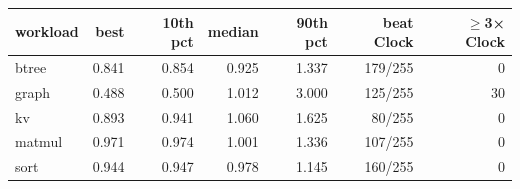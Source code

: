 \begin{tabular}{lrrrrrr}
\toprule
workload & best & 10th pct & median & 90th pct & beat Clock & $\geq$3× Clock \\
\midrule
btree & 0.841 & 0.854 & 0.925 & 1.337 & 179/255 & 0 \\
graph & 0.488 & 0.500 & 1.012 & 3.000 & 125/255 & 30 \\
kv & 0.893 & 0.941 & 1.060 & 1.625 & 80/255 & 0 \\
matmul & 0.971 & 0.974 & 1.001 & 1.336 & 107/255 & 0 \\
sort & 0.944 & 0.947 & 0.978 & 1.145 & 160/255 & 0 \\
\bottomrule
\end{tabular}
